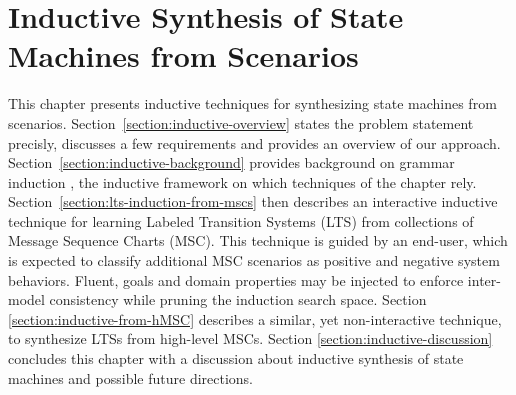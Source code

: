 \chapter{Inductive Synthesis of State Machines from Scenarios\label{chapter:inductive-synthesis}}

This chapter presents inductive techniques for synthesizing state machines from scenarios. Section~\ref{section:inductive-overview} states the problem statement precisly, discusses a few requirements and provides an overview of our approach. Section~\ref{section:inductive-background} provides background on grammar induction \cite{Gold:1978}, the inductive framework on which techniques of the chapter rely. Section~\ref{section:lts-induction-from-mscs} then describes an interactive inductive technique for learning Labeled Transition Systems (LTS) from collections of Message Sequence Charts (MSC). This technique is guided by an end-user, which is expected to classify additional MSC scenarios as positive and negative system behaviors. Fluent, goals and domain properties may be injected to enforce inter-model consistency while pruning the induction search space. Section \ref{section:inductive-from-hMSC} describes a similar, yet non-interactive technique, to synthesize LTSs from high-level MSCs. Section \ref{section:inductive-discussion} concludes this chapter with a discussion about inductive synthesis of state machines and possible future directions. 







